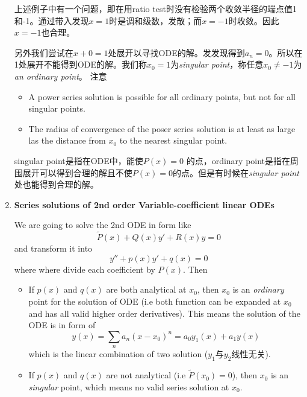 \documentclass[10pt]{article}
\newenvironment{changemargin}[2]{%
  \begin{list}{}{%
    \setlength{\topsep}{0pt}%
    \setlength{\leftmargin}{#1}%
    \setlength{\rightmargin}{#2}%
    \setlength{\listparindent}{\parindent}%
    \setlength{\itemindent}{\parindent}%
    \setlength{\parsep}{\parskip}%
  }%
  \item[]}{\end{list}}
\begin{document}
\begin{changemargin}{-0.125in}{0in}
\begin{enumerate}
	   	   \medskip
	   	   
	   	   上述例子中有一个问题，即在用ratio test时没有检验两个收敛半径的端点值1和-1。通过带入发现$x=1$时是调和级数，发散；而$x =-1$时收敛。因此$x=-1$也合理。
	   	   
	   	   \medskip
	   	   
	   	   另外我们尝试在$x+0 = 1$处展开以寻找ODE的解。发发现得到$a_n = 0$。所以在1处展开不能得到ODE的解。我们称$x_0 = 1$为\textit{singular point}，称任意$x_0 \neq -1$为\textit{an ordinary point}。 注意 
	   	   \begin{itemize}
	   	   	\item A power series solution is possible for all ordinary points, but not for all singular points.
	   	   	\item The radius of convergence of the poser series solution is at least as large las the distance from $x_0$ to the nearest singular point.
	   	   \end{itemize}
	   	   
	   	   singular point是指在ODE中，能使$P(x) = 0$ 的点，ordinary point是指在周围展开可以得到合理的解且不使$P(x)=0$的点。但是有时候在\textit{singular point}处也能得到合理的解。
	   	   
	   	   \medskip
	   	   
	   	   \item \textbf{Series solutions of 2nd order Variable-coefficient linear ODEs}
	   	   
	   	   \medskip
	   	   
	   	   We are going to solve the 2nd ODE in form like 
	   	   \[
	   	   \tilde{P}(x) + Q(x)y' + R(x)y = 0
	   	   \]
	   	   and transform it into 
	   	   \[
	   	   y'' + p(x)y' + q(x) = 0
	   	   \]
	   	   where where divide each coefficient by $P(x)$. Then 
	   	   \begin{itemize}
	   	   	\item If $p(x)$ and $q(x)$ are both analytical at $x_0$, then $x_0$ is an \textit{ordinary} point for the solution of ODE (i.e both function can be expanded at $x_0$ and has all valid higher order derivatives). This means the solution of the ODE is in form of
	   	   	\[
	   	   	y(x)= \sum_n a_n(x-x_0)^n = a_0y_1(x) + a_1y(x)
	   	   	\] 
	   	   	 which is the linear combination of two solution ($y_1$与$y_2$线性无关). 
	   	   	
	   	   	\medskip
	   	   	
	   	   	\item If $p(x)$ and $q(x)$ are not analytical (i.e $\tilde{P}(x_0) = 0$), then $x_0$ is an \textit{singular} point, which means no valid series solution at $x_0$.
	   	   	

\end{itemize}
\end{enumerate}
\end{changemargin}
\end{document}
